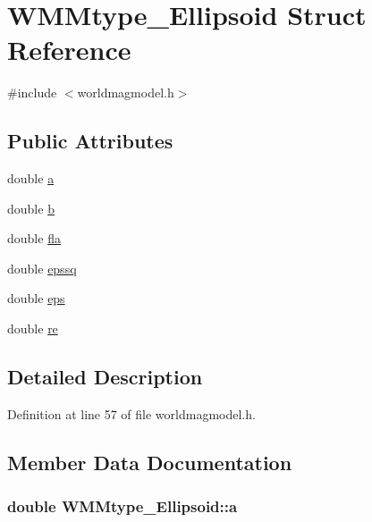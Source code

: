 \hypertarget{struct_w_m_mtype___ellipsoid}{\section{\-W\-M\-Mtype\-\_\-\-Ellipsoid \-Struct \-Reference}
\label{struct_w_m_mtype___ellipsoid}
}


{\ttfamily \#include $<$worldmagmodel.\-h$>$}

\subsection*{\-Public \-Attributes}
\begin{DoxyCompactItemize}
\item 
double \hyperlink{struct_w_m_mtype___ellipsoid_add41097d897f17de01f4e22c4a765859}{a}
\item 
double \hyperlink{struct_w_m_mtype___ellipsoid_a700f1bab0f80706ecc671bdbb000a0a6}{b}
\item 
double \hyperlink{struct_w_m_mtype___ellipsoid_a001bda565c83d57cf057d66dcc6f92ea}{fla}
\item 
double \hyperlink{struct_w_m_mtype___ellipsoid_ab21d8812b21bf6481a495af07bc746ee}{epssq}
\item 
double \hyperlink{struct_w_m_mtype___ellipsoid_a294084e52ea367c0e1cd4ed78a7cb29d}{eps}
\item 
double \hyperlink{struct_w_m_mtype___ellipsoid_aa051b086d02950addfe843925a79b3f9}{re}
\end{DoxyCompactItemize}


\subsection{\-Detailed \-Description}


\-Definition at line 57 of file worldmagmodel.\-h.



\subsection{\-Member \-Data \-Documentation}
\hypertarget{struct_w_m_mtype___ellipsoid_add41097d897f17de01f4e22c4a765859}{
\subsubsection[{a}]{\setlength{\rightskip}{0pt plus 5cm}double {\bf \-W\-M\-Mtype\-\_\-\-Ellipsoid\-::a}}}\label{struct_w_m_mtype___ellipsoid_add41097d897f17de01f4e22c4a765859}


